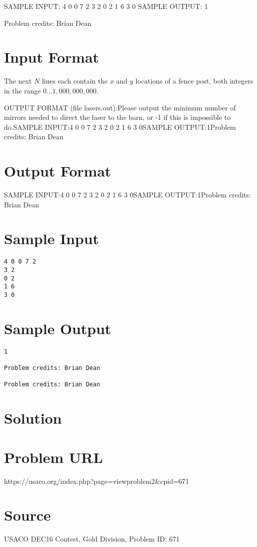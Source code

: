 \documentclass[12pt]{article}
\begin{document}
SAMPLE INPUT:
4 0 0 7 2
3 2
0 2
1 6
3 0
SAMPLE OUTPUT: 
1


Problem credits: Brian Dean



\section*{Input Format}
The next $N$ lines each contain the $x$ and $y$ locations of a fence post, both
integers in the range
$0 \ldots 1,000,000,000$.

OUTPUT FORMAT (file lasers.out):Please output the minimum number of mirrors needed to direct the laser to the
barn, or -1 if this is impossible to do.SAMPLE INPUT:4 0 0 7 2
3 2
0 2
1 6
3 0SAMPLE OUTPUT:1Problem credits: Brian Dean

\section*{Output Format}
SAMPLE INPUT:4 0 0 7 2
3 2
0 2
1 6
3 0SAMPLE OUTPUT:1Problem credits: Brian Dean

\section*{Sample Input}
\begin{verbatim}
4 0 0 7 2
3 2
0 2
1 6
3 0
\end{verbatim}

\section*{Sample Output}
\begin{verbatim}
1

Problem credits: Brian Dean

Problem credits: Brian Dean
\end{verbatim}

\section*{Solution}


\section*{Problem URL}
https://usaco.org/index.php?page=viewproblem2&cpid=671

\section*{Source}
USACO DEC16 Contest, Gold Division, Problem ID: 671
\end{document}
